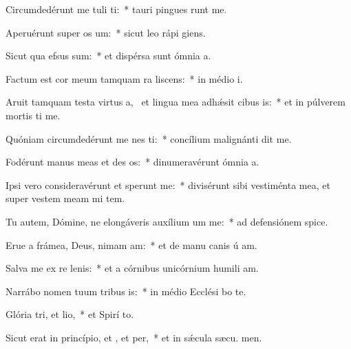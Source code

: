 \item Circumdedérunt me tuli ti:~* tauri pingues runt me.
\item Aperuérunt super  os um:~* sicut leo rápi  giens.
\item Sicut qua efsus sum:~* et dispérsa sunt ómnia  a.
\item Factum est cor meum tamquam ra liscens:~* in médio  i.
\item Aruit tamquam testa virtus a,~\pscross{} et lingua mea adhǽsit cibus is:~* et in púlverem mortis ti me.
\item Quóniam circumdedérunt me nes ti:~* concílium malignánti dit me.
\item Fodérunt manus meas et des os:~* dinumeravérunt ómnia  a.
\item Ipsi vero consideravérunt et sperunt me:~* divisérunt sibi vestiménta mea, et super vestem meam mi tem.
\item Tu autem, Dómine, ne elongáveris auxílium um  me:~* ad defensiónem  spice.
\item Erue a frámea, Deus, nimam am:~* et de manu canis ú am.
\item Salva me ex re lenis:~* et a córnibus unicórnium humili am.
\item Narrábo nomen tuum tribus is:~* in médio Ecclési bo te.
\item Glória tri, et lio,~* et Spirí to.
\item Sicut erat in princípio, et , et per,~* et in sǽcula sæcu. men.
